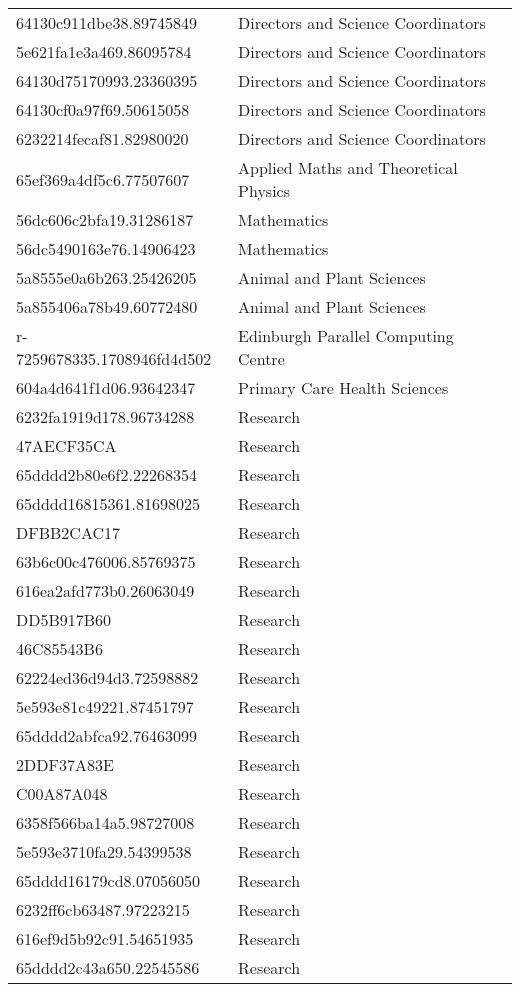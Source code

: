 \begin{tabular}{ll}
64130c911dbe38.89745849 & Directors and Science Coordinators \\
5e621fa1e3a469.86095784 & Directors and Science Coordinators \\
64130d75170993.23360395 & Directors and Science Coordinators \\
64130cf0a97f69.50615058 & Directors and Science Coordinators \\
6232214fecaf81.82980020 & Directors and Science Coordinators \\
65ef369a4df5c6.77507607 & Applied Maths and Theoretical Physics \\
56dc606c2bfa19.31286187 & Mathematics \\
56dc5490163e76.14906423 & Mathematics \\
5a8555e0a6b263.25426205 & Animal and Plant Sciences \\
5a855406a78b49.60772480 & Animal and Plant Sciences \\
r-7259678335.1708946fd4d502 & Edinburgh Parallel Computing Centre \\
604a4d641f1d06.93642347 & Primary Care Health Sciences \\
6232fa1919d178.96734288 & Research \\
47AECF35CA & Research \\
65dddd2b80e6f2.22268354 & Research \\
65dddd16815361.81698025 & Research \\
DFBB2CAC17 & Research \\
63b6c00c476006.85769375 & Research \\
616ea2afd773b0.26063049 & Research \\
DD5B917B60 & Research \\
46C85543B6 & Research \\
62224ed36d94d3.72598882 & Research \\
5e593e81c49221.87451797 & Research \\
65dddd2abfca92.76463099 & Research \\
2DDF37A83E & Research \\
C00A87A048 & Research \\
6358f566ba14a5.98727008 & Research \\
5e593e3710fa29.54399538 & Research \\
65dddd16179cd8.07056050 & Research \\
6232ff6cb63487.97223215 & Research \\
616ef9d5b92c91.54651935 & Research \\
65dddd2c43a650.22545586 & Research \\

\end{tabular}
